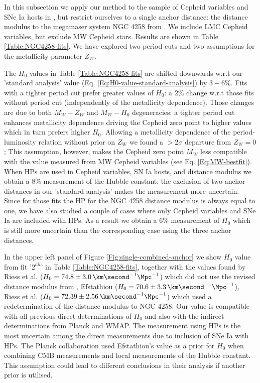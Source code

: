 In this subsection we apply our method to the sample of Cepheid variables and SNe Ia hosts in \cite{Riess:2011yx}, but restrict ourselves to a single anchor distance: the distance modulus to the megamaser system NGC 4258 from \cite{Humphreys:2013eja}. We include LMC Cepheid variables, but exclude MW Cepheid stars.  Results are shown in Table \ref{Table:NGC4258-fits}. We have explored two period cuts and two assumptions for the metallicity parameter $Z_W$.

The $H_0$ values in Table \ref{Table:NGC4258-fits} are shifted downwards w.r.t our 'standard analysis' value (Eq. \ref{Eq:H0-value-standard-analysis}) by $3-6 \%$. Fits with a tighter period cut prefer greater values of $H_0$: a $2\%$ change w.r.t those fits without period cut (independently of the metallicity dependence). Those changes are due to both $M_W-Z_W$ and $M_W-H_0$ degeneracies: a tighter period cut enhances metallicity dependence driving the Cepheid zero point to higher values which in turn prefers higher $H_0$. Allowing a metallicity dependence of the period-luminosity relation without prior on $Z_W$ we found a $>2\sigma$ departure from $Z_W=0$; This assumption, however, makes the Cepheid zero point $M_W$ less compatible with the value measured from MW Cepheid variables (see Eq. \eqref{Eq:MW-bestfit}). When HPs are used in Cepheid variables, SN Ia hosts, and distance modulus we obtain a $8\%$ measurement of the Hubble constant: the exclusion of two anchor distances in our 'standard analysis' makes the measurement more uncertain. Since for those fits the HP for the NGC 4258 distance modulus is always equal to one, we have also studied a couple of cases where only Cepheid variables and SNe Ia are included with HPs. As a result we obtain a $6\%$ measurement of $H_0$ which is still more uncertain than the corresponding case using the three anchor distances.

In the upper left panel of Figure \ref{Fig:single-combined-anchor} we show $H_0$ value from fit '$2^{ah}$' in Table \ref{Table:NGC4258-fits}, together with the values found by Riess et al. \cite{Riess:2011yx} ($H_0=74.8\pm 3.0 \, \km \second^{-1} \Mpc^{-1}$) which did not use the revised distance modulus from \cite{Humphreys:2013eja}, Efstathiou \cite{Efstathiou:2013via} ($H_0 = 70.6 \pm 3.3 \, \km \second^{-1} \Mpc^{-1}$), Riess et al. \cite{Riess:2016jrr} ($H_0=72.39\pm 2.56 \, \km \second^{-1} \Mpc^{-1}$) which used a redetermination of the distance modulus to NGC 4258. Our value is compatible with all previous direct determinations of $H_0$ and also with the indirect determinations from Planck and WMAP. The measurement using HPs is the most uncertain among the direct measurements due to inclusion of SNe Ia with HPs. The Planck collaboration used Efstathiou's value as a prior for $H_0$ when combining CMB measurements and local measurements of the Hubble constant. This assumption could lead to different conclusions in their analysis if another prior is utilised.

